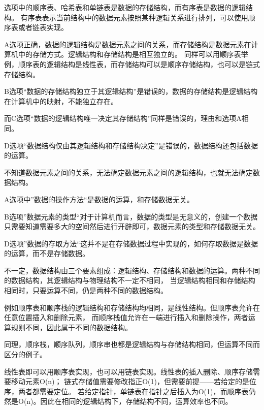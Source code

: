 \documentclass[b5paper,11pt]{article}
\begin{document}

选项中的顺序表、哈希表和单链表是数据的存储结构，而有序表是数据的逻辑结构。
有序表表示当前结构中的数据元素按照某种逻辑关系进行排列，可以使用顺序表或者链表实现。


A选项正确，数据的逻辑结构是数据元素之间的关系，而存储结构是数据元素在计算机中的存储方式。逻辑结构和存储结构是相互独立的。
同样可以用顺序表举例，顺序表的逻辑结构是线性表，而存储结构可以是顺序存储结构，也可以是链式存储结构。

B选项“数据的存储结构独立于其逻辑结构”是错误的，数据的存储结构是逻辑结构在计算机中的映射，不能独立存在。

而C选项“数据的逻辑结构唯一决定其存储结构”同样是错误的，理由和选项A相同。

D选项“数据结构仅由其逻辑结构和存储结构决定”是错误的，数据结构还包括数据的运算。


不知道数据元素之间的关系，无法确定数据元素之间的逻辑结构，也就无法确定数据结构。

A选项中”数据的操作方法“是数据的运算，和存储数据无关。

B选项”数据元素的类型“对于计算机而言，数据的类型是无意义的，创建一个数据只需要知道需要多大的空间然后进行开辟即可，数据元素的类型和存储数据无关。

D选项”数据的存取方法“这并不是在存储数据过程中实现的，如何存取数据是数据的运算，而不是存储数据。

不一定，数据结构由三个要素组成：逻辑结构、存储结构和数据的运算。两种不同的数据结构，其逻辑结构与物理结构不一定不相同，
当逻辑结构相同和存储结构相同时，只要运算不同，仍是两种不同的数据结构。

例如顺序表和顺序栈的逻辑结构和存储结构均相同，是线性结构。但顺序表允许在任意位置插入和删除元素，
而顺序栈值允许在一端进行插入和删除操作，两者运算规则不同，因此属于不同的数据结构。

同理，顺序栈，顺序队列，顺序串也都是逻辑结构与存储结构相同，但运算不同而区分的例子。


线性表即可以用顺序表实现，也可以用链表实现。线性表的插入删除、顺序存储需要移动元素O(n)；
链式存储值需要修改指正O(1)，但需要前提——若给定的是位序，两者都需要定位。
若给定指针，单链表在指针之后插入为O(1)，而顺序表仍然是O(n)。因此在相同的逻辑结构下，存储结构不同，运算效率也不同。
\end{document}

